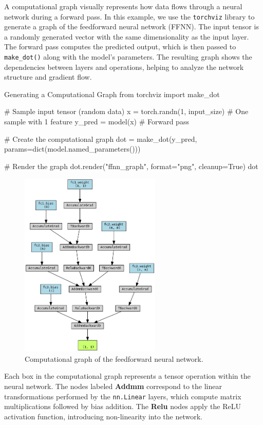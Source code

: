 A computational graph visually represents how data flows through a neural network during a forward pass. In this example, we use the \texttt{torchviz} library to generate a graph of the feedforward neural network (FFNN). The input tensor is a randomly generated vector with the same dimensionality as the input layer. The forward pass computes the predicted output, which is then passed to \texttt{make\_dot()} along with the model’s parameters. The resulting graph shows the dependencies between layers and operations, helping to analyze the network structure and gradient flow.

\begin{codeonly}{Generating a Computational Graph}
from torchviz import make_dot

# Sample input tensor (random data)
x = torch.randn(1, input_size)  # One sample with 1 feature
y_pred = model(x)  # Forward pass

# Create the computational graph
dot = make_dot(y_pred, params=dict(model.named_parameters()))

# Render the graph
dot.render("ffnn_graph", format="png", cleanup=True)
dot
\end{codeonly}

\begin{figure}
    \centering
    \includegraphics[width=0.6\textwidth]{images/ffnn_graph.png}
    \caption{Computational graph of the feedforward neural network.}
\end{figure}

Each box in the computational graph represents a tensor operation within the neural network. The nodes labeled \textbf{Addmm} correspond to the linear transformations performed by the \texttt{nn.Linear} layers, which compute matrix multiplications followed by bias addition. The \textbf{Relu} nodes apply the ReLU activation function, introducing non-linearity into the network. 

